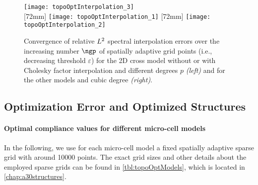 \begin{figure}
  \hspace*{5mm}%
  \texttt{[image: topoOptInterpolation\_3]}%
  \hfill%
  \\[2mm]%
  [72mm]{%
    \texttt{[image: topoOptInterpolation\_1]}%
  }%
  \hfill%
  [72mm]{%
    \texttt{[image: topoOptInterpolation\_2]}%
  }%
  \caption[Convergence of relative $L^2$ spectral interpolation errors]{%
    Convergence of relative $L^2$ spectral interpolation errors
    over the increasing number $\ngp$ of spatially adaptive grid points
    (i.e., decreasing threshold $\varepsilon$)
    for the 2D cross model without or with Cholesky factor interpolation
    and different degrees $p$ \emph{(left)} and
    for the other models and cubic degree \emph{(right)}.%
  }%
  \label{fig:topoOptInterpolationErrorBasisFunctions}%
\end{figure}



\subsection{Optimization Error and Optimized Structures}
\label{sec:644optimization}

\paragraph{Optimal compliance values for different micro-cell models}

In the following, we use for each micro-cell model
a fixed spatially adaptive sparse grid with around \num{10000} points.
The exact grid sizes and other details about the employed sparse grids
can be found in \cref{tbl:topoOptModels}, which is located in
\cref{chap:a30structures}.

\dummytext[2]{}


